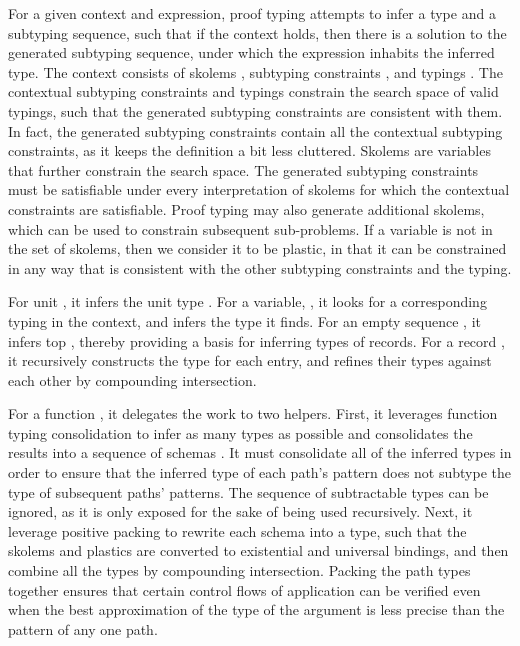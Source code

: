 \documentclass[table,dvipsnames,acmsmall]{acmart}
\theoremstyle{definition}
\begin{document}
\noindent
For a given context and expression, 
proof typing attempts to infer a type and a subtyping sequence,
such that if the context holds,
then there is a solution to the generated subtyping sequence, under which 
the expression inhabits the inferred type.
The context consists of skolems \ms{\Theta}, subtyping constraints \ms{\Delta}, and typings \ms{\Gamma}. 
The contextual subtyping constraints and typings constrain the search space of valid typings, 
such that the generated subtyping constraints are consistent with them. 
In fact, the generated subtyping constraints contain
all the contextual subtyping constraints, as it keeps the definition a bit less cluttered.
Skolems are variables that further constrain the search space. 
The generated subtyping constraints must be satisfiable under every interpretation of
skolems for which the contextual constraints are satisfiable.  
Proof typing may also generate additional skolems, which can be used to constrain
subsequent sub-problems.
If a variable is not in the set of skolems, then we consider it to be plastic,
in that it can be constrained in any way that is consistent with the other subtyping constraints
and the typing. 



\noindent
For unit , it infers the unit type . 
For a variable, , it looks for a corresponding typing in the context, 
and infers the type it finds.
For an empty sequence \ms{\epsilon}, 
it infers top ,
thereby providing a basis for inferring types of records. 
For a record ,  
it recursively constructs the type for each entry, and
refines their types against each other by compounding intersection.

For a function ,  
it delegates the work to two helpers. 
First, it leverages function typing consolidation 
to infer as many types as possible
and consolidates the results into a sequence of schemas \ms{\Pi}.
It must consolidate all of the inferred types in order to
ensure that the inferred type of each 
path's pattern does not subtype the type of subsequent paths' patterns. 
The sequence of subtractable types \ms{\Xi} can be ignored, as it is only
exposed for the sake of being used recursively.
Next, it leverage positive packing 
to rewrite each schema into a type,
such that the skolems and plastics are converted to
existential and universal bindings,
and then combine all the types by compounding intersection.
Packing the path types together ensures that certain
control flows of application can be verified even when  
the best approximation of the type of the argument
is less precise than the pattern of any one path.
\end{document}
